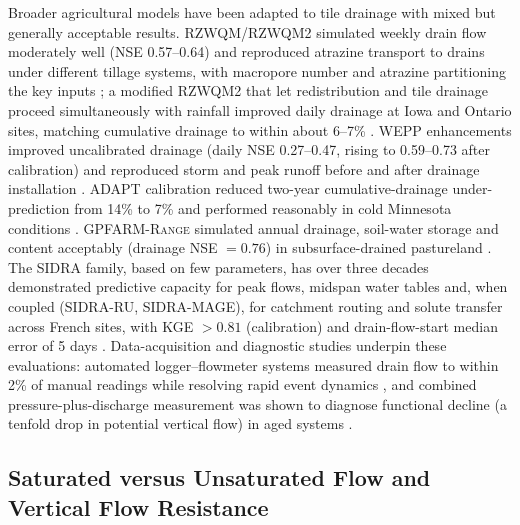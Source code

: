 Broader agricultural models have been adapted to tile drainage with mixed but generally acceptable results. \textsc{RZWQM}/\textsc{RZWQM2} simulated weekly drain flow moderately well (NSE 0.57--0.64) and reproduced atrazine transport to drains under different tillage systems, with macropore number and atrazine partitioning the key inputs \parencite{Malone2014,Singh1996}; a modified \textsc{RZWQM2} that let redistribution and tile drainage proceed simultaneously with rainfall improved daily drainage at Iowa and Ontario sites, matching cumulative drainage to within about 6--7\% \parencite{Xian2017}. \textsc{WEPP} enhancements improved uncalibrated drainage (daily NSE 0.27--0.47, rising to 0.59--0.73 after calibration) and reproduced storm and peak runoff before and after drainage installation \parencite{RevueltaAcosta2021,SAVABI1993}. \textsc{ADAPT} calibration reduced two-year cumulative-drainage under-prediction from 14\% to 7\% and performed reasonably in cold Minnesota conditions \parencite{Mendez2004}. \textsc{GPFARM-Range} simulated annual drainage, soil-water storage and content acceptably (drainage NSE $=0.76$) in subsurface-drained pastureland \parencite{Chen2016}. The \textsc{SIDRA} family, based on few parameters, has over three decades demonstrated predictive capacity for peak flows, midspan water tables and, when coupled (\textsc{SIDRA-RU}, \textsc{SIDRA-MAGE}), for catchment routing and solute transfer across French sites, with KGE $>0.81$ (calibration) and drain-flow-start median error of 5 days \parencite{Zimmer2023,Henine2022,LESAFFRE1988,Giraud1997}. Data-acquisition and diagnostic studies underpin these evaluations: automated logger--flowmeter systems measured drain flow to within 2\% of manual readings while resolving rapid event dynamics \parencite{Kanwar1999}, and combined pressure-plus-discharge measurement was shown to diagnose functional decline (a tenfold drop in potential vertical flow) in aged systems \parencite{Nishida2020,Gurklys2008}.

\subsection{Saturated versus Unsaturated Flow and Vertical Flow Resistance}

